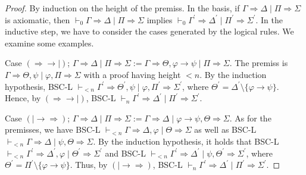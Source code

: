 \documentclass[11pt,a4paper,titlepage]{article}
\theoremstyle{definition}
\newcommand{\3}{\vspace{.3in}}
\newcommand{\2}{\vspace{.2in}}
\newcommand{\1}{\vspace{.1in}}
\newcommand{\5}{\vspace{.05in}}
\begin{document}
\begin{proof}
	By induction on the height of the premiss. In the basis, if $ \Gamma\Rightarrow\Delta\mid\Pi\Rightarrow\Sigma $ is
	axiomatic, then $ \vdash_0\Gamma\Rightarrow\Delta\mid\Pi\Rightarrow\Sigma $ implies $ \vdash_0 \Gamma^\prime\Rightarrow\Delta^\prime\mid\Pi^\prime\Rightarrow\Sigma^\prime$. In the
	inductive step, we have to consider the cases generated by the logical rules. We examine some examples.
	
Case $ (\Rightarrow\rightarrow\mid) $; $ \Gamma\Rightarrow\Delta\mid\Pi\Rightarrow\Sigma:=\Gamma\Rightarrow\Theta,\varphi\rightarrow\psi\mid\Pi\Rightarrow\Sigma $. The premiss is $ \Gamma\Rightarrow\Theta,\psi\mid\varphi,\Pi\Rightarrow\Sigma $ with a proof having height $ < n $. By the induction hypothesis, BSC-L $ \vdash_{<n}\Gamma^\prime\Rightarrow\Theta^\prime,\psi\mid\varphi,\Pi^\prime\Rightarrow\Sigma^\prime $, where $ \Theta^\prime=\Delta^\prime\setminus\{\varphi\rightarrow\psi\} $. Hence, by $ (\Rightarrow\rightarrow\mid) $, BSC-L $ \vdash_{n}\Gamma^\prime\Rightarrow\Delta^\prime\mid\Pi^\prime\Rightarrow\Sigma^\prime $.

Case $ (\mid\rightarrow\Rightarrow) $; $ \Gamma\Rightarrow\Delta\mid\Pi\Rightarrow\Sigma:=\Gamma\Rightarrow\Delta\mid\varphi\rightarrow\psi,\Theta\Rightarrow\Sigma$. As for the premisses, we have BSC-L $ \vdash_{<n}\Gamma\Rightarrow\Delta,\varphi\mid\Theta\Rightarrow\Sigma$ as well as BSC-L  $ \vdash_{<n}\Gamma\Rightarrow\Delta\mid\psi,\Theta\Rightarrow\Sigma$. By the induction hypothesis, it holds that BSC-L $ \vdash_{<n}\Gamma^\prime\Rightarrow\Delta^\prime,\varphi\mid\Theta^\prime\Rightarrow\Sigma^\prime$ and BSC-L  $ \vdash_{<n}\Gamma^\prime\Rightarrow\Delta^\prime\mid\psi,\Theta^\prime\Rightarrow\Sigma^\prime$, where $ \Theta^\prime=\Pi^\prime\setminus\{\varphi\rightarrow\psi\} $. Thus, by $ (\mid\rightarrow\Rightarrow) $, BSC-L $ \vdash_{n}\Gamma^\prime\Rightarrow\Delta^\prime\mid\Pi^\prime\Rightarrow\Sigma^\prime $.
\end{proof}
\end{document}
